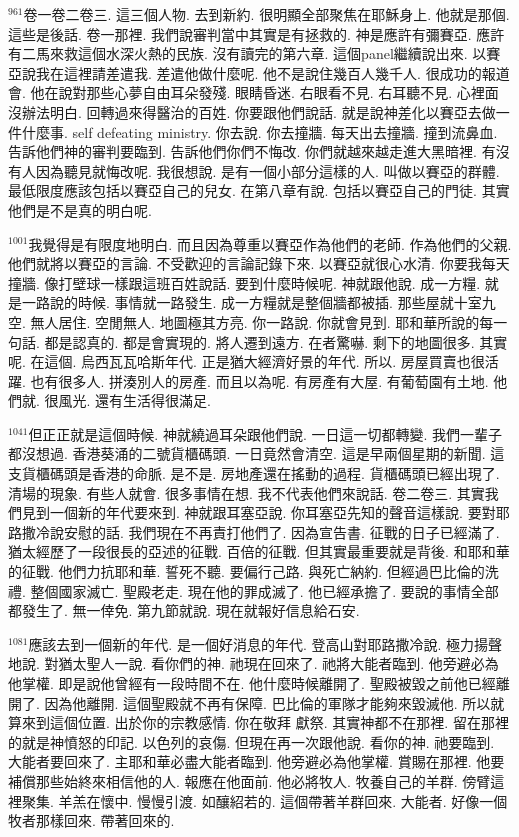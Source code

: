 \documentclass{book}
\begin{document}
$^{961}$卷一卷二卷三.
這三個人物.
去到新約.
很明顯全部聚焦在耶穌身上.
他就是那個.
這些是後話.
卷一那裡.
我們說審判當中其實是有拯救的.
神是應許有彌賽亞.
應許有二馬來救這個水深火熱的民族.
沒有讀完的第六章.
這個panel繼續說出來.
以賽亞說我在這裡請差遣我.
差遣他做什麼呢.
他不是說住幾百人幾千人.
很成功的報道會.
他在說對那些心夢自由耳朵發殘.
眼睛昏迷.
右眼看不見.
右耳聽不見.
心裡面沒辦法明白.
回轉過來得醫治的百姓.
你要跟他們說話.
就是說神差化以賽亞去做一件什麼事.
self defeating ministry.
你去說.
你去撞牆.
每天出去撞牆.
撞到流鼻血.
告訴他們神的審判要臨到.
告訴他們你們不悔改.
你們就越來越走進大黑暗裡.
有沒有人因為聽見就悔改呢.
我很想說.
是有一個小部分這樣的人.
叫做以賽亞的群體.
最低限度應該包括以賽亞自己的兒女.
在第八章有說.
包括以賽亞自己的門徒.
其實他們是不是真的明白呢.

$^{1001}$我覺得是有限度地明白.
而且因為尊重以賽亞作為他們的老師.
作為他們的父親.
他們就將以賽亞的言論.
不受歡迎的言論記錄下來.
以賽亞就很心水清.
你要我每天撞牆.
像打壁球一樣跟這班百姓說話.
要到什麼時候呢.
神就跟他說.
成一方糧.
就是一路說的時候.
事情就一路發生.
成一方糧就是整個牆都被插.
那些屋就十室九空.
無人居住.
空閒無人.
地圖極其方亮.
你一路說.
你就會見到.
耶和華所說的每一句話.
都是認真的.
都是會實現的.
將人遷到遠方.
在者驚嚇.
剩下的地圖很多.
其實呢.
在這個.
烏西瓦瓦哈斯年代.
正是猶大經濟好景的年代.
所以.
房屋買賣也很活躍.
也有很多人.
拼湊別人的房產.
而且以為呢.
有房產有大屋.
有葡萄園有土地.
他們就.
很風光.
還有生活得很滿足.

$^{1041}$但正正就是這個時候.
神就繞過耳朵跟他們說.
一日這一切都轉變.
我們一輩子都沒想過.
香港葵涌的二號貨櫃碼頭.
一日竟然會清空.
這是早兩個星期的新聞.
這支貨櫃碼頭是香港的命脈.
是不是.
房地產還在搖動的過程.
貨櫃碼頭已經出現了.
清場的現象.
有些人就會.
很多事情在想.
我不代表他們來說話.
卷二卷三.
其實我們見到一個新的年代要來到.
神就跟耳塞亞說.
你耳塞亞先知的聲音這樣說.
要對耶路撒冷說安慰的話.
我們現在不再責打他們了.
因為宣告書.
征戰的日子已經滿了.
猶太經歷了一段很長的亞述的征戰.
百倍的征戰.
但其實最重要就是背後.
和耶和華的征戰.
他們力抗耶和華.
誓死不聽.
要偏行己路.
與死亡納約.
但經過巴比倫的洗禮.
整個國家滅亡.
聖殿老走.
現在他的罪成滅了.
他已經承擔了.
要說的事情全部都發生了.
無一倖免.
第九節就說.
現在就報好信息給石安.

$^{1081}$應該去到一個新的年代.
是一個好消息的年代.
登高山對耶路撒冷說.
極力揚聲地說.
對猶太聖人一說.
看你們的神.
祂現在回來了.
祂將大能者臨到.
他旁避必為他掌權.
即是說他曾經有一段時間不在.
他什麼時候離開了.
聖殿被毀之前他已經離開了.
因為他離開.
這個聖殿就不再有保障.
巴比倫的軍隊才能夠來毀滅他.
所以就算來到這個位置.
出於你的宗教感情.
你在敬拜 獻祭.
其實神都不在那裡.
留在那裡的就是神憤怒的印記.
以色列的哀傷.
但現在再一次跟他說.
看你的神.
祂要臨到.
大能者要回來了.
主耶和華必盡大能者臨到.
他旁避必為他掌權.
賞賜在那裡.
他要補償那些始終來相信他的人.
報應在他面前.
他必將牧人.
牧養自己的羊群.
傍臂這裡聚集.
羊羔在懷中.
慢慢引渡.
如釀紹若的.
這個帶著羊群回來.
大能者.
好像一個牧者那樣回來.
帶著回來的.
\end{document}
